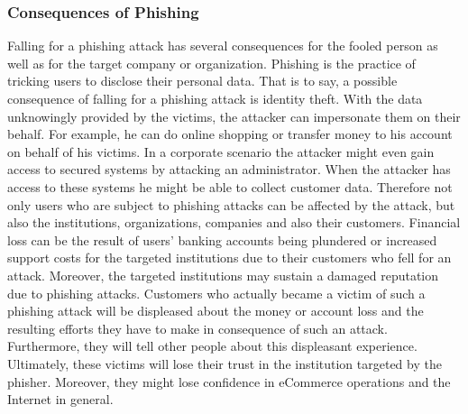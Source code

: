 \subsubsection{Consequences of Phishing}
Falling for a phishing attack has several consequences for the fooled person as well as for the target company or organization.
 Phishing is the practice of tricking users to disclose their personal data.
 That is to say, a possible consequence of falling for a phishing attack is identity theft.
 With the data unknowingly provided by the victims, the attacker can impersonate them on their behalf.
 For example, he can do online shopping or transfer money to his account on behalf of his victims.
 In a corporate scenario the attacker might even gain access to secured systems by attacking an administrator.
 When the attacker has access to these systems he might be able to collect customer data.
 Therefore not only users who are subject to phishing attacks can be affected by the attack, but also the institutions, organizations, companies and also their customers.
 Financial loss can be the result of users' banking accounts being plundered or increased support costs for the targeted institutions due to their customers who fell for an attack.
 Moreover, the targeted institutions may sustain a damaged reputation due to phishing attacks.
 Customers who actually became a victim of such a phishing attack will be displeased about the money or account loss and the resulting efforts they have to make in consequence of such an attack.
 Furthermore, they will tell other people about this displeasant experience.
 Ultimately, these victims will lose their trust in the institution targeted by the phisher.
 Moreover, they might lose confidence in eCommerce operations and the Internet in general.



